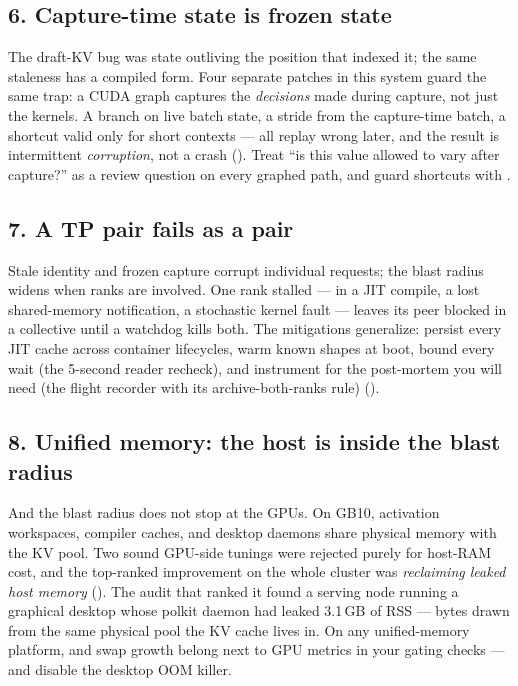 \subsection*{6. Capture-time state is frozen state}
The draft-KV bug was state outliving the position that indexed it; the same
staleness has a compiled form.
Four separate patches in this system guard the same trap: a CUDA graph
captures the \emph{decisions} made during capture, not just the kernels. A
branch on live batch state, a stride from the capture-time batch, a
shortcut valid only for short contexts --- all replay wrong later, and the
result is intermittent \emph{corruption}, not a crash ().
Treat ``is this value allowed to vary after capture?'' as a review question
on every graphed path, and guard shortcuts with
.

\subsection*{7. A TP pair fails as a pair}
Stale identity and frozen capture corrupt individual requests; the blast
radius widens when ranks are involved. One rank stalled --- in a JIT compile, a lost shared-memory notification, a
stochastic kernel fault --- leaves its peer blocked in a collective until a
watchdog kills both. The mitigations generalize: persist every JIT cache
across container lifecycles, warm known shapes at boot, bound every wait
(the 5-second reader recheck), and instrument for the post-mortem you will
need (the flight recorder with its archive-both-ranks rule)
().

\subsection*{8. Unified memory: the host is inside the blast radius}
And the blast radius does not stop at the GPUs. On GB10, activation
workspaces, compiler caches, and desktop daemons share
physical memory with the KV pool. Two sound GPU-side tunings were rejected
purely for host-RAM cost, and the top-ranked improvement on the whole
cluster was \emph{reclaiming leaked host memory} (). The
audit that ranked it found a serving node running a graphical desktop whose
polkit daemon had leaked 3.1\,GB of RSS --- bytes drawn from the same
physical pool the KV cache lives in. On any
unified-memory platform,  and swap growth belong next to
GPU metrics in your gating checks --- and disable the desktop OOM killer.


